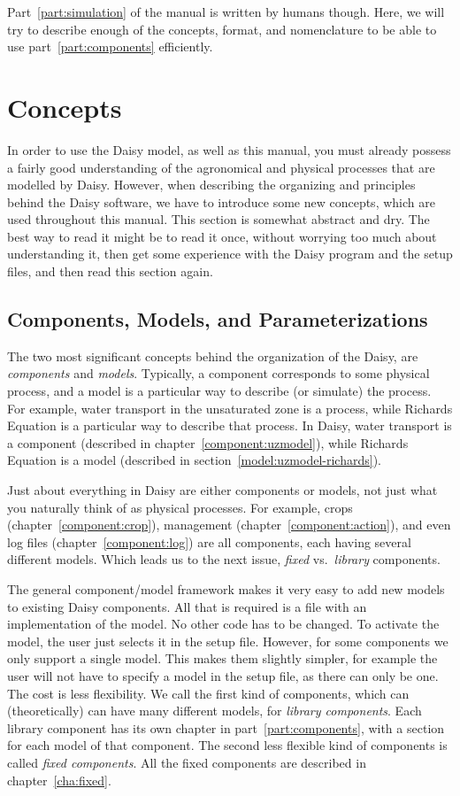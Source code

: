 Part~\ref{part:simulation} of the manual is written by humans though.
Here, we will try to describe enough of the concepts, format, and
nomenclature to be able to use part~\ref{part:components} efficiently.

\section{Concepts}
\label{sec:concepts}

In order to use the Daisy model, as well as this manual, you must
already possess a fairly good understanding of the agronomical and
physical processes that are modelled by Daisy.  However, when
describing the organizing and principles behind the Daisy software, we
have to introduce some new concepts, which are used throughout this
manual.  This section is somewhat abstract and dry.  The best way to
read it might be to read it once, without worrying too much about
understanding it, then get some experience with the Daisy program and
the setup files, and then read this section again.

\subsection{Components, Models, and Parameterizations}

The two most significant concepts behind the organization of the
Daisy, are \emph{components} and \emph{models}.  Typically, a
component corresponds to some physical process, and a model is a
particular way to describe (or simulate) the process.  For example,
water transport in the unsaturated zone is a process, while Richards
Equation is a particular way to describe that process.  In Daisy,
water transport is a component (described in
chapter~\ref{component:uzmodel}), while Richards Equation is a model
(described in section~\ref{model:uzmodel-richards}).

Just about everything in Daisy are either components or models, not
just what you naturally think of as physical processes.  For example,
crops (chapter~\ref{component:crop}), management
(chapter~\ref{component:action}), and even log files
(chapter~\ref{component:log}) are all components, each having several
different models. Which leads us to the next issue, \emph{fixed} vs.\
\emph{library} components.

The general component/model framework makes it very easy to add new
models to existing Daisy components.  All that is required is a
\cplusplus{} file with an implementation of the model.  No other code
has to be changed.  To activate the model, the user just selects it in
the setup file.  However, for some components we only support a single
model.  This makes them slightly simpler, for example the user will
not have to specify a model in the setup file, as there can only be
one.  The cost is less flexibility.  We call the first kind of
components, which can (theoretically) can have many different models,
for \emph{library components}.  Each library component has its own
chapter in part~\ref{part:components}, with a section for each model
of that component.  The second less flexible kind of components is
called \emph{fixed components}.  All the fixed components are described
in chapter~\ref{cha:fixed}.

